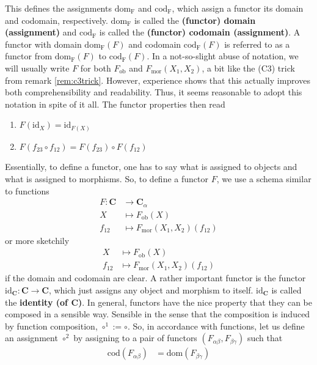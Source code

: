 This defines the assignments $\mathrm{dom_{F}}$ and $\mathrm{cod_{F}}$, which assign a functor its domain and codomain, respectively.
$\mathrm{dom_{F}}$ is called the \textbf{(functor) domain (assignment)} and $\mathrm{cod_{F}}$ is called the \textbf{(functor) codomain (assignment)}.
A functor with domain $\mathrm{dom_{F}}(F)$ and codomain $\mathrm{cod_{F}}(F)$ is referred to as a functor from $\mathrm{dom_{F}}(F)$ to $\mathrm{cod_{F}}(F)$.
In a not-so-slight abuse of notation, we will usually write $F$ for both $F_{\mathrm{ob}}$ and $F_{\mathrm{mor}}(X_{1},X_{2})$, a bit like the (C3) trick from remark \ref{rem:c3trick}.
However, experience shows that this actually improves both comprehensibility and readability.
Thus, it seems reasonable to adopt this notation in spite of it all.
The functor properties then read
\begin{enumerate}
\item[(F1)]
$F(\mathrm{id}_{X}) = \mathrm{id}_{F(X)}$
\item[(F2)]
$F(f_{23} \circ f_{12}) = F(f_{23}) \circ F(f_{12})$
\end{enumerate}
Essentially, to define a functor, one has to say what is assigned to objects and what is assigned to morphisms.
So, to define a functor $F$, we use a schema similar to functions
\begin{align*}
  F
  \colon
  \mathbf{C}
  &\rightarrow
  \mathbf{C}_{\alpha}
  \\
  X
  &\mapsto
  F_{\mathrm{ob}}(X)
  \\
  f_{12}
  &\mapsto
  F_{\mathrm{mor}}(X_{1},X_{2})(f_{12})
\end{align*}
or more sketchily
\begin{align*}
  X
  &\mapsto
  F_{\mathrm{ob}}(X)
  \\
  f_{12}
  &\mapsto
  F_{\mathrm{mor}}(X_{1},X_{2})(f_{12})
\end{align*}
if the domain and codomain are clear.
A rather important functor is the functor $\mathrm{id}_{\mathbf{C}} \colon \mathbf{C} \rightarrow \mathbf{C}$, which just assigns any object and morphism to itself.
$\mathrm{id}_{\mathbf{C}}$ is called the \textbf{identity (of $\mathbf{C}$)}.
In general, functors have the nice property that they can be composed in a sensible way.
Sensible in the sense that the composition is induced by function composition, $\circ^{1} := \circ$.
So, in accordance with functions, let us define an assignment $\circ^{2}$ by assigning to a pair of functors $(F_{\alpha\beta},F_{\beta\gamma})$ such that
\begin{align*}
  \mathrm{cod}(F_{\alpha\beta})
  &=
  \mathrm{dom}(F_{\beta\gamma})
\end{align*}
